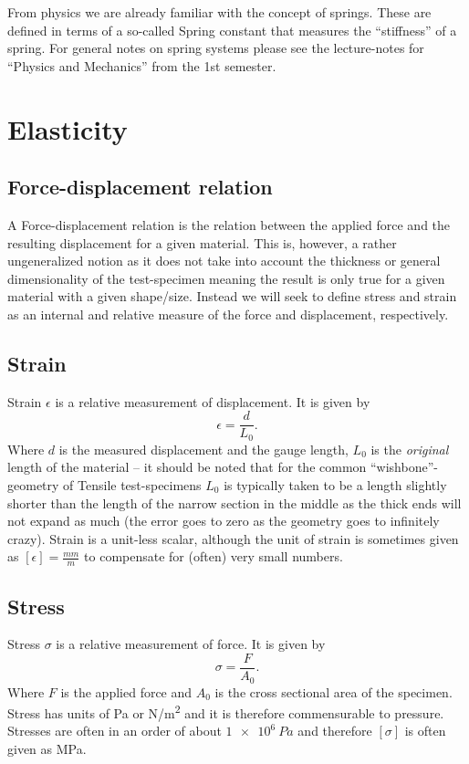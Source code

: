 From physics we are already familiar with the concept of springs. These are defined in terms of a so-called Spring constant that measures the ``stiffness'' of a spring. For general notes on spring systems please see the lecture-notes for ``Physics and Mechanics'' from the 1st semester.

\section{Elasticity}

\subsection{Force-displacement relation}
A Force-displacement relation is the relation between the applied force and the resulting displacement for a given material. This is, however, a rather ungeneralized notion as it does not take into account the thickness or general dimensionality of the test-specimen meaning the result is only true for a given material with a given shape/size. Instead we will seek to define stress and strain as an internal and relative measure of the force and displacement, respectively.

\subsection{Strain}
Strain $\epsilon$ is a relative measurement of displacement. It is given by
\[ 
\epsilon = \frac{d}{L_0}
.\]
Where $d$ is the measured displacement and the gauge length, $L_0$ is the \textit{original} length of the material -- it should be noted that for the common ``wishbone''-geometry of Tensile test-specimens $L_0$ is typically taken to be a length slightly shorter than the length of the narrow section in the middle as the thick ends will not expand as much (the error goes to zero as the geometry goes to infinitely crazy). Strain is a unit-less scalar, although the unit of strain is sometimes given as $[\epsilon] = \unit{\frac{mm}{m}}$ to compensate for (often) very small numbers.

\subsection{Stress}
Stress $\sigma$ is a relative measurement of force. It is given by
\[ 
\sigma = \frac{F}{A_0}
.\]
Where $F$ is the applied force and $A_0$ is the cross sectional area of the specimen. Stress has units of \unit{Pa} or \unit{N/m^2} and it is therefore commensurable to pressure. Stresses are often in an order of about $\qty{1e6}{Pa}$ and therefore $[\sigma]$ is often given as \unit{MPa}.

